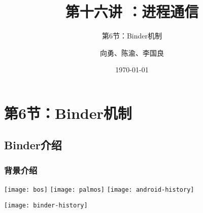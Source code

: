


\title[第16讲]{第十六讲 ：进程通信} %
\subtitle{第6节：Binder机制}
\author{向勇、陈渝、李国良} %
\date{\today} %



\begin{frame}
\titlepage %
\end{frame}

%
\section{第6节：Binder机制} %
\subsection{Binder介绍} %
\begin{frame}[plain]
	\frametitle{背景介绍}
	\centering
	\texttt{[image: bos]}
	\texttt{[image: palmos]}
	\texttt{[image: android-history]}

	\texttt{[image: binder-history]}
\end{frame}

